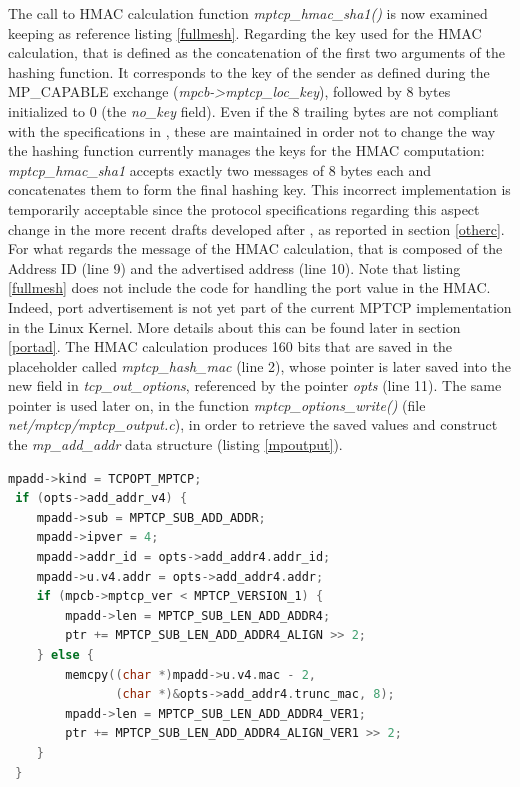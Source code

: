 The call to HMAC calculation function \textit{mptcp\_hmac\_sha1()} is now examined keeping as reference listing \ref{fullmesh}. Regarding the key used for the HMAC calculation, that is defined as the concatenation of the first two arguments of the hashing function. It corresponds to the key of the sender as defined during the MP\_CAPABLE exchange (\textit{mpcb->mptcp\_loc\_key}), followed by 8 bytes initialized to 0 (the \textit{no\_key} field). Even if the 8 trailing bytes are not compliant with the specifications in , these are maintained in order not to change the way the hashing function currently manages the keys for the HMAC computation: \textit{mptcp\_hmac\_sha1} accepts exactly two messages of 8 bytes each and concatenates them to form the final hashing key. This incorrect implementation is temporarily acceptable since the protocol specifications regarding this aspect change in the more recent drafts developed after , as reported in section \ref{otherc}.
For what regards the message of the HMAC calculation, that is composed of the Address ID (line 9) and the advertised address (line 10). Note that listing \ref{fullmesh} does not include the code for handling the port value in the HMAC. Indeed, port advertisement is not yet part of the current MPTCP implementation in the Linux Kernel. More details about this can be found later in section \ref{portad}. 
The HMAC calculation produces 160 bits that are saved in the placeholder called \textit{mptcp\_hash\_mac} (line 2), whose pointer is later saved into the new field in \textit{tcp\_out\_options}, referenced by the pointer \textit{opts} (line 11). The same pointer is used later on, in the function \textit{mptcp\_options\_write()} (file \textit{net/mptcp/mptcp\_output.c}), in order to retrieve the saved values and construct the \textit{mp\_add\_addr} data structure (listing \ref{mpoutput}).

\begin{lstlisting}[language=c, caption=\textit{Building ADD\_ADDR2 output message}, label=mpoutput]
 mpadd->kind = TCPOPT_MPTCP;
 if (opts->add_addr_v4) {
 	mpadd->sub = MPTCP_SUB_ADD_ADDR;
 	mpadd->ipver = 4;
 	mpadd->addr_id = opts->add_addr4.addr_id;
 	mpadd->u.v4.addr = opts->add_addr4.addr;
 	if (mpcb->mptcp_ver < MPTCP_VERSION_1) {
 		mpadd->len = MPTCP_SUB_LEN_ADD_ADDR4;
 		ptr += MPTCP_SUB_LEN_ADD_ADDR4_ALIGN >> 2;
 	} else {
 		memcpy((char *)mpadd->u.v4.mac - 2,
 		       (char *)&opts->add_addr4.trunc_mac, 8);
 		mpadd->len = MPTCP_SUB_LEN_ADD_ADDR4_VER1;
 		ptr += MPTCP_SUB_LEN_ADD_ADDR4_ALIGN_VER1 >> 2;
 	}
 }
\end{lstlisting}

